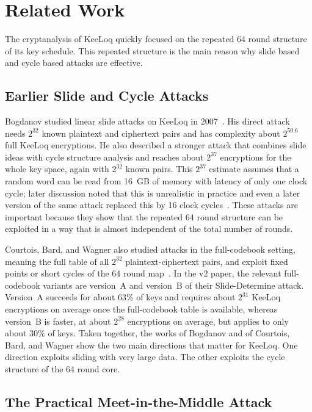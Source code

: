 \documentclass[version=preprint]{iacrcc}
\begin{document}
\section{Related Work}\label{sec:related-work}

The cryptanalysis of KeeLoq quickly focused on the repeated 64 round structure of its key schedule.
This repeated structure is the main reason why slide based and cycle based attacks are effective.

\subsection{Earlier Slide and Cycle Attacks}

Bogdanov studied linear slide attacks on KeeLoq in 2007~\cite{bogdanov2007linear}.
His direct attack needs $2^{32}$ known plaintext and ciphertext pairs and has complexity about $2^{50.6}$ full KeeLoq encryptions.
He also described a stronger attack that combines slide ideas with cycle structure analysis and reaches about $2^{37}$ encryptions for the whole key space, again with $2^{32}$ known pairs.
This $2^{37}$ estimate assumes that a random word can be read from 16~GB of memory with latency of only one clock cycle; later discussion noted that this is unrealistic in practice and even a later version of the same attack replaced this by 16 clock cycles~\cite{indesteege2008practical}.
These attacks are important because they show that the repeated 64 round structure can be exploited in a way that is almost independent of the total number of rounds.

Courtois, Bard, and Wagner also studied attacks in the full-codebook setting, meaning the full table of all $2^{32}$ plaintext-ciphertext pairs, and exploit fixed points or short cycles of the 64 round map~\cite{courtois2007algebraic}.
In the v2 paper, the relevant full-codebook variants are version~A and version~B of their Slide-Determine attack.
Version~A succeeds for about $63\%$ of keys and requires about $2^{31}$ KeeLoq encryptions on average once the full-codebook table is available, whereas version~B is faster, at about $2^{28}$ encryptions on average, but applies to only about $30\%$ of keys.
Taken together, the works of Bogdanov and of Courtois, Bard, and Wagner show the two main directions that matter for KeeLoq.
One direction exploits sliding with very large data.
The other exploits the cycle structure of the 64 round core.

\subsection{The Practical Meet-in-the-Middle Attack}
\end{document}

